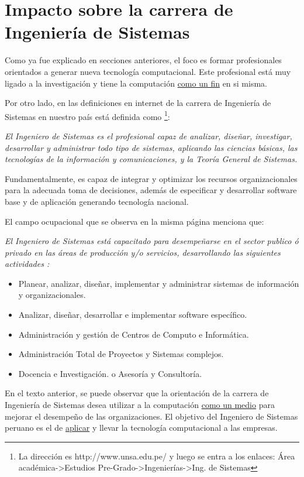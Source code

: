 \section{Impacto sobre la carrera de Ingenierí­a de Sistemas}\label{sec:impacto-en-sistemas}
Como ya fue explicado en secciones anteriores, el foco es formar
profesionales orientados a generar nueva tecnologí­a computacional.
Este profesional está muy ligado a la investigación y tiene la
computación \underline{como un fin} en si misma.

Por otro lado, en las definiciones en internet de la carrera de Ingenierí­a de Sistemas en nuestro paí­s está definida como \footnote{La
dirección es http://www.unsa.edu.pe/ y luego se entra a los enlaces:
Área académica->Estudios Pre-Grado->Ingenierí­as->Ing. de Sistemas}:

{\it El Ingeniero de Sistemas es el profesional capaz de analizar, diseñar, investigar, desarrollar y administrar todo tipo de sistemas, aplicando las ciencias básicas, las tecnologí­as de la información y comunicaciones, y la Teorí­a General de Sistemas.

Fundamentalmente, es capaz de integrar y optimizar los recursos organizacionales para la adecuada toma de decisiones, además de especificar y desarrollar software base y de aplicación generando tecnologí­a nacional.}

El campo ocupacional que se observa en la misma página menciona que:

{\it El Ingeniero de Sistemas está capacitado para desempeñarse en el sector publico ó privado en las áreas de producción y/o servicios, desarrollando las siguientes actividades :

\begin{itemize}
    \item Planear, analizar, diseñar, implementar y administrar sistemas de información y organizacionales.
    \item Analizar, diseñar, desarrollar e implementar software especí­fico.
    \item Administración y gestión de Centros de Computo e Informática.
    \item Administración Total de Proyectos y Sistemas complejos.
    \item Docencia e Investigación. o Asesorí­a y Consultorí­a.
\end{itemize}
}

En el texto anterior, se puede observar que la orientación de la carrera de Ingenierí­a de Sistemas desea utilizar a la computación \underline{como un medio} para mejorar el desempeño de las organizaciones. El objetivo del Ingeniero de Sistemas peruano es el de \underline{aplicar} y llevar la tecnologí­a computacional a las empresas.

